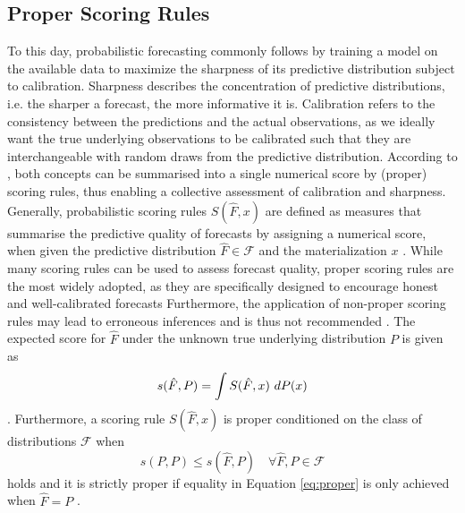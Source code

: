 \documentclass[a4paper,oneside,bibliography=totoc]{scrbook}
\begin{document}
\subsection{Proper Scoring Rules}
To this day, probabilistic forecasting commonly follows \citet{gneiting_probabilistic_2007} by training a model on the available data to maximize the sharpness of its predictive distribution subject to calibration. Sharpness describes the concentration of predictive distributions, i.e. the sharper a forecast, the more informative it is. 
Calibration refers to the consistency between the predictions and the actual observations, as we ideally want the true underlying observations to be calibrated such that they are interchangeable with random draws from the predictive distribution. 
According to \citet{gneiting_probabilistic_2014}, both concepts can be summarised into a single numerical score by (proper) scoring rules, thus enabling a collective assessment of calibration and sharpness. 
Generally, probabilistic scoring rules $S(\hat{F},x)$ are defined as measures that summarise the predictive quality of forecasts by assigning a numerical score, when given the predictive distribution $\hat{F} \in \mathcal{F}$ and the materialization $x$ \cite{gneiting_probabilistic_2007}. 
While many scoring rules can be used to assess forecast quality, proper scoring rules are the most widely adopted, as they are specifically designed to encourage honest and well-calibrated forecasts \cite{machete_contrasting_2013}
Furthermore, the application of non-proper scoring rules may lead to erroneous inferences and is thus not recommended \cite{gneiting_comparing_2011}.
The expected score for $\hat{F}$ under the unknown true underlying distribution $P$ is given as
\begin{equation}
    s(\hat{F}, P) = \int S(\hat{F}, x) \thinspace \thinspace dP(x)
\end{equation}
\cite{gneiting_strictly_2007}.
Furthermore, a scoring rule $S(\hat{F}, x)$ is proper conditioned on the class of distributions $\mathcal{F}$ when
\begin{equation}
    s(P, P) \leq s(\hat{F}, P) \quad \forall \hat{F}, P \in \mathcal{F}
    \label{eq:proper}
\end{equation}
holds and it is strictly proper if equality in Equation \ref{eq:proper} is only achieved when $\hat{F}=P$ \cite{gneiting_strictly_2007, tyralis_review_2024}.
\end{document}
